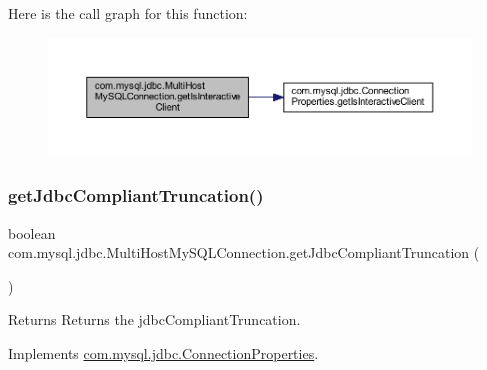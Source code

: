 Here is the call graph for this function\+:
\nopagebreak
\begin{figure}[H]
\begin{center}
\leavevmode
\includegraphics[width=350pt]{classcom_1_1mysql_1_1jdbc_1_1_multi_host_my_s_q_l_connection_a49aeeb12ed118d916aaba4f6144ce24d_cgraph}
\end{center}
\end{figure}
\mbox{\label{classcom_1_1mysql_1_1jdbc_1_1_multi_host_my_s_q_l_connection_aa7498b944d87abde92d8e38ddd15afe9}} 
\subsubsection{\texorpdfstring{get\+Jdbc\+Compliant\+Truncation()}{getJdbcCompliantTruncation()}}
{\footnotesize\ttfamily boolean com.\+mysql.\+jdbc.\+Multi\+Host\+My\+S\+Q\+L\+Connection.\+get\+Jdbc\+Compliant\+Truncation (\begin{DoxyParamCaption}{ }\end{DoxyParamCaption})}

\begin{DoxyReturn}{Returns}
Returns the jdbc\+Compliant\+Truncation. 
\end{DoxyReturn}


Implements \mbox{\hyperlink{interfacecom_1_1mysql_1_1jdbc_1_1_connection_properties_a97ae1e1a15afdeb0b6a04efd3d58459e}{com.\+mysql.\+jdbc.\+Connection\+Properties}}.

